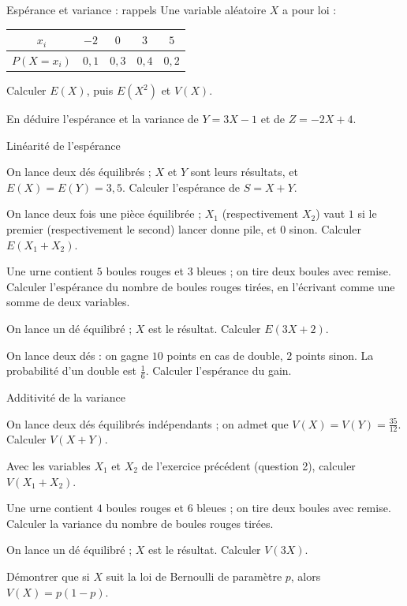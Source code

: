 \exercices
{}

\begin{exercice}[1]{Espérance et variance : rappels}
Une variable aléatoire $X$ a pour loi :\qquad
{\renewcommand{\arraystretch}{1.3}\begin{tabular}{c|cccc}
$x_i$ & $-2$ & $0$ & $3$ & $5$\\\hline
$P(X=x_i)$ & $0{,}1$ & $0{,}3$ & $0{,}4$ & $0{,}2$
\end{tabular}}
\begin{questions}
  \item Calculer $E(X)$, puis $E\left(X^{2}\right)$ et $V(X)$.
  \item En déduire l'espérance et la variance de $Y=3X-1$ et de $Z=-2X+4$.
\end{questions}
\end{exercice}

\begin{exercice}[1]{Linéarité de l'espérance}
\begin{questions}
  \item On lance deux dés équilibrés ; $X$ et $Y$ sont leurs résultats, et $E(X)=E(Y)=3{,}5$. Calculer l'espérance de $S=X+Y$.
  \item On lance deux fois une pièce équilibrée ; $X_1$ (respectivement $X_2$) vaut $1$ si le premier (respectivement le second)
    lancer donne pile, et $0$ sinon. Calculer $E(X_1+X_2)$.
  \item Une urne contient $5$ boules rouges et $3$ bleues ; on tire deux boules avec remise. Calculer l'espérance du nombre de
    boules rouges tirées, en l'écrivant comme une somme de deux variables.
  \item On lance un dé équilibré ; $X$ est le résultat. Calculer $E(3X+2)$.
  \item On lance deux dés : on gagne $10$ points en cas de double, $2$ points sinon. La probabilité d'un double est $\frac16$.
    Calculer l'espérance du gain.
\end{questions}
\end{exercice}

\begin{exercice}[1]{Additivité de la variance}
\begin{questions}
  \item On lance deux dés équilibrés indépendants ; on admet que $V(X)=V(Y)=\frac{35}{12}$. Calculer $V(X+Y)$.
  \item Avec les variables $X_1$ et $X_2$ de l'exercice précédent (question 2), calculer $V(X_1+X_2)$.
  \item Une urne contient $4$ boules rouges et $6$ bleues ; on tire deux boules avec remise. Calculer la variance du nombre de boules
    rouges tirées.
  \item On lance un dé équilibré ; $X$ est le résultat. Calculer $V(3X)$.
  \item Démontrer que si $X$ suit la loi de Bernoulli de paramètre $p$, alors $V(X)=p(1-p)$.
\end{questions}
\end{exercice}

